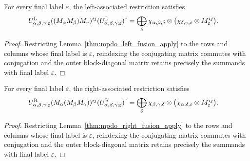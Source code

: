 \begin{lemma}%
    \label{thm:mpdo_left_final_fusion_apply}
    \leanok
    For every final label $\varepsilon$, the left-associated restriction
    satisfies
    \begin{align}
        U^{\mathrm L}_{\alpha,\beta,\gamma;\varepsilon}
        ((M_\alpha M_\beta)M_\gamma)^{ij}
        (U^{\mathrm L}_{\alpha,\beta,\gamma;\varepsilon})^\dagger
         & =\bigoplus_{\delta}
        \chi_{\alpha,\beta,\delta}\otimes
        \bigl(\chi_{\delta,\gamma,\varepsilon}\otimes
        M_\varepsilon^{ij}\bigr).
        \notag
    \end{align}
\end{lemma}
\begin{proof}\leanok
    Restricting Lemma~\ref{thm:mpdo_left_fusion_apply} to the rows and
    columns whose final label is $\varepsilon$, reindexing the conjugating
    matrix commutes with conjugation and the outer block-diagonal matrix
    retains precisely the summands with final label $\varepsilon$.
\end{proof}

\begin{lemma}%
    \label{thm:mpdo_right_final_fusion_apply}
    \leanok
    For every final label $\varepsilon$, the right-associated restriction
    satisfies
    \begin{align}
        U^{\mathrm R}_{\alpha,\beta,\gamma;\varepsilon}
        (M_\alpha(M_\beta M_\gamma))^{ij}
        (U^{\mathrm R}_{\alpha,\beta,\gamma;\varepsilon})^\dagger
         & =\bigoplus_{\delta}
        \chi_{\beta,\gamma,\delta}\otimes
        \bigl(\chi_{\alpha,\delta,\varepsilon}\otimes
        M_\varepsilon^{ij}\bigr).
        \notag
    \end{align}
\end{lemma}
\begin{proof}\leanok
    Restricting Lemma~\ref{thm:mpdo_right_fusion_apply} to the rows and
    columns whose final label is $\varepsilon$, reindexing the conjugating
    matrix commutes with conjugation and the outer block-diagonal matrix
    retains precisely the summands with final label $\varepsilon$.
\end{proof}


